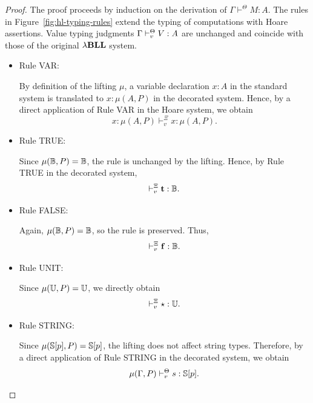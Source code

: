 \begin{proof}
The proof proceeds by induction on the derivation of $\Gamma \vdash^{\Theta} M : A$. The rules in Figure~\ref{fig:hl-typing-rules} extend the typing of computations with Hoare assertions. Value typing judgments $\Gamma \vdash^\Theta_v V : A$ are unchanged and coincide with those of the original ${\lambda}\mathbf{BLL}$ system.  

\begin{itemize}
    \item Rule VAR:
    \begin{mathpar}
    \end{mathpar}
    By definition of the lifting $\mu$, a variable declaration
    $x : A$ in the standard system is translated to
    $x : \mu(A,P)$ in the decorated system. Hence, by a direct
    application of Rule VAR in the Hoare system, we obtain
    \[
        x : \mu(A,P) \vdash^{\Xi}_{v} x : \mu(A,P).
    \]

    \item Rule TRUE:
    \begin{mathpar}
    \end{mathpar}
    Since $\mu(\mathbb{B},P)=\mathbb{B}$, the rule is unchanged by the lifting.
    Hence, by Rule TRUE in the decorated system,
    \[
        \vdash^{\Xi}_{v} \mathbf{t} : \mathbb{B} .
    \]

    \item Rule FALSE:
    \begin{mathpar}
    \end{mathpar}
    Again, $\mu(\mathbb{B},P)=\mathbb{B}$, so the rule is preserved.
    Thus,
    \[
        \vdash^{\Xi}_{v} \mathbf{f} : \mathbb{B} .
    \]

    \item Rule UNIT:
    \begin{mathpar}
    \end{mathpar}
    Since $\mu(\mathbb{U},P)=\mathbb{U}$, we directly obtain
    \[
        \vdash^{\Xi}_{v} \star : \mathbb{U} .
    \]

    \item Rule STRING:
    \begin{mathpar}
    \end{mathpar}
    Since $\mu(\mathbb{S}[p],P)=\mathbb{S}[p]$, the lifting does not affect
    string types. Therefore, by a direct application of Rule STRING in the decorated system, we obtain
    \[ \mu(\Gamma,P) \vdash^\Theta_v s: \mathbb{S}[p]. \]


\end{itemize}
\end{proof}
